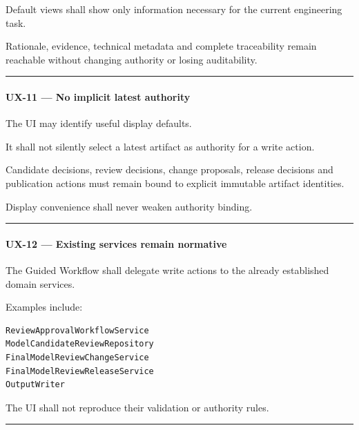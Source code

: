 Default views shall show only information necessary for the current engineering task.

Rationale, evidence, technical metadata and complete traceability remain reachable without changing authority or losing auditability.

\begin{center}\rule{0.5\linewidth}{0.5pt}\end{center}

\hypertarget{ux-11--no-implicit-latest-authority}{%
\paragraph{UX-11 --- No implicit latest authority}\label{ux-11--no-implicit-latest-authority}}

The UI may identify useful display defaults.

It shall not silently select a latest artifact as authority for a write action.

Candidate decisions, review decisions, change proposals, release decisions and publication actions must remain bound to explicit immutable artifact identities.

Display convenience shall never weaken authority binding.

\begin{center}\rule{0.5\linewidth}{0.5pt}\end{center}

\hypertarget{ux-12--existing-services-remain-normative}{%
\paragraph{UX-12 --- Existing services remain normative}\label{ux-12--existing-services-remain-normative}}

The Guided Workflow shall delegate write actions to the already established domain services.

Examples include:

\begin{verbatim}
ReviewApprovalWorkflowService
ModelCandidateReviewRepository
FinalModelReviewChangeService
FinalModelReviewReleaseService
OutputWriter
\end{verbatim}

The UI shall not reproduce their validation or authority rules.

\begin{center}\rule{0.5\linewidth}{0.5pt}\end{center}

